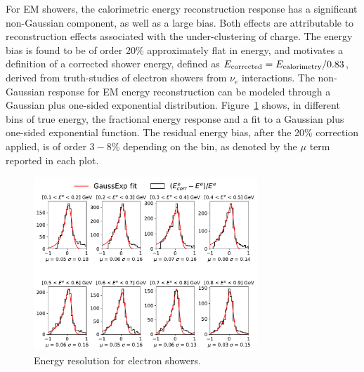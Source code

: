  \par For EM showers, the calorimetric energy reconstruction response has a significant non-Gaussian component, as well as a large bias. Both effects are attributable to reconstruction effects associated with the under-clustering of charge. The energy bias is found to be of order 20\% approximately flat in energy, and motivates a definition of a corrected shower energy, defined as $E_{\rm corrected} = E_{\rm calorimetry} / 0.83$, derived from truth-studies of electron showers from $\nu_e$ interactions. The non-Gaussian response for EM energy reconstruction can be modeled through a Gaussian plus one-sided exponential distribution. Figure~\ref{fig:eres:elec:binned} shows, in different bins of true energy, the fractional energy response and a fit to a Gaussian plus one-sided exponential function. The residual energy bias, after the 20\% correction applied, is of order $3-8$\% depending on the bin, as denoted by the $\mu$ term reported in each plot. 
 
\begin{figure}[ht]
\begin{center}
\includegraphics[width=0.75\textwidth]{ereco/elec_eres_binned.pdf}
\caption{\label{fig:eres:elec:binned}Energy resolution for electron showers.}
\end{center}
\end{figure}
 
\clearpage


